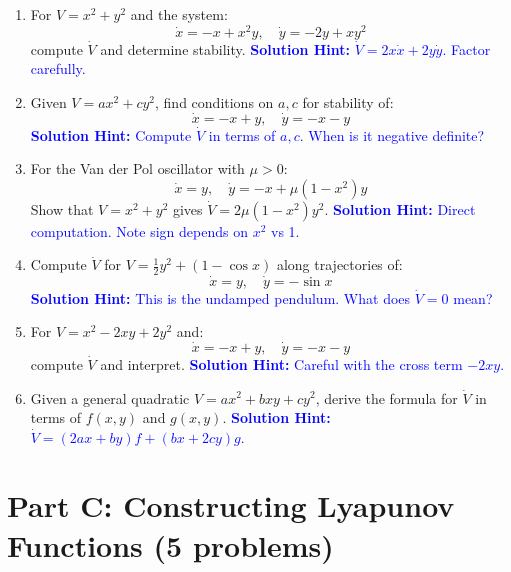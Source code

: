 \documentclass[12pt]{article}
\newcommand{\solution}[1]{\textcolor{blue}{\textbf{Solution Hint:} #1}}
\begin{document}
\begin{enumerate}[resume]
\item For $V = x^2 + y^2$ and the system:
$$\dot{x} = -x + x^2y, \quad \dot{y} = -2y + xy^2$$
compute $\dot{V}$ and determine stability.
\solution{$\dot{V} = 2x\dot{x} + 2y\dot{y}$. Factor carefully.}

\item Given $V = ax^2 + cy^2$, find conditions on $a,c$ for stability of:
$$\dot{x} = -x + y, \quad \dot{y} = -x - y$$
\solution{Compute $\dot{V}$ in terms of $a,c$. When is it negative definite?}

\item For the Van der Pol oscillator with $\mu > 0$:
$$\dot{x} = y, \quad \dot{y} = -x + \mu(1-x^2)y$$
Show that $V = x^2 + y^2$ gives $\dot{V} = 2\mu(1-x^2)y^2$.
\solution{Direct computation. Note sign depends on $x^2$ vs 1.}

\item Compute $\dot{V}$ for $V = \frac{1}{2}y^2 + (1-\cos x)$ along trajectories of:
$$\dot{x} = y, \quad \dot{y} = -\sin x$$
\solution{This is the undamped pendulum. What does $\dot{V} = 0$ mean?}

\item For $V = x^2 - 2xy + 2y^2$ and:
$$\dot{x} = -x + y, \quad \dot{y} = -x - y$$
compute $\dot{V}$ and interpret.
\solution{Careful with the cross term $-2xy$.}

\item Given a general quadratic $V = ax^2 + bxy + cy^2$, derive the formula for $\dot{V}$ in terms of $f(x,y)$ and $g(x,y)$.
\solution{$\dot{V} = (2ax + by)f + (bx + 2cy)g$.}
\end{enumerate}

\section*{Part C: Constructing Lyapunov Functions (5 problems)}
\end{document}
